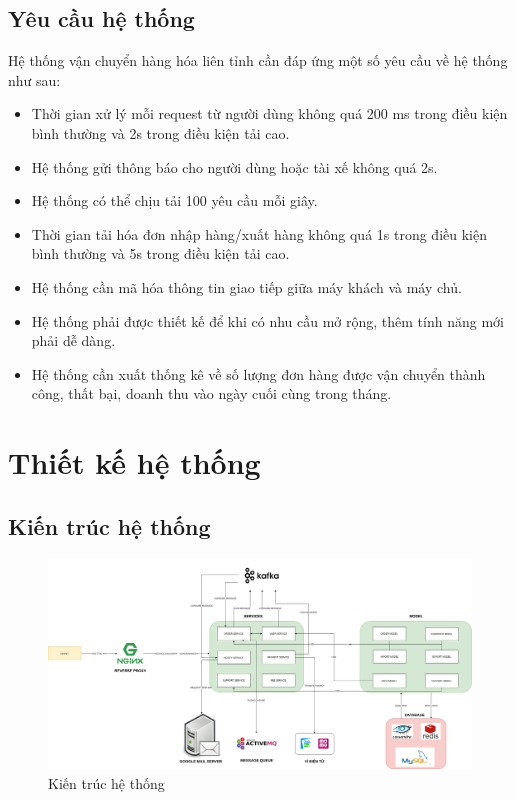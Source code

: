     \subsection{Yêu cầu hệ thống}
    Hệ thống vận chuyển hàng hóa liên tỉnh cần đáp ứng một số yêu cầu về hệ thống như sau:
        \begin{itemize}
            \item Thời gian xử lý mỗi request từ người dùng không quá 200 ms trong điều kiện bình thường và 2s trong điều kiện tải cao.
            \item Hệ thống gửi thông báo cho người dùng hoặc tài xế  không quá 2s.
            \item Hệ thống có thể chịu tải 100 yêu cầu mỗi giây.
            \item Thời gian tải hóa đơn nhập hàng/xuất hàng không quá 1s trong điều kiện bình thường và 5s trong điều kiện tải cao.
            \item Hệ thống cần mã hóa thông tin giao tiếp giữa máy khách và máy chủ.
            \item Hệ thống phải được thiết kế để khi có nhu cầu mở rộng, thêm tính năng mới phải dễ dàng.
            \item Hệ thống cần xuất thống kê về số lượng đơn hàng được vận chuyển thành công, thất bại, doanh thu vào ngày cuối cùng trong tháng.
        \end{itemize}
    
    \newpage

\section{Thiết kế hệ thống}

\subsection{Kiến trúc hệ thống}
	
		\begin{figure}[H]
			\includegraphics[width=1\textwidth]{Images/SystemArchitecture.jpg}
			\centering
			\linebreak
			\caption{Kiến trúc hệ thống}
		\end{figure}
	

